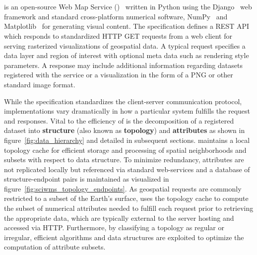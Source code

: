 \section{\sciwms{}}
\label{sec:sciwms}
\Sciwms{} is an open-source Web Map Service (\wms{})~\cite{wms14} written in
Python using the Django~\cite{django} web framework and standard
cross-platform numerical software, NumPy~\cite{numpy11} and
Matplotlib~\cite{hunter07} for generating visual content. The \wms{}
specification defines a REST API~\cite{Fielding02} which responds to
standardized HTTP GET requests from a web client for serving
rasterized visualizations of geospatial data. A typical \wms{} request
specifies a data layer and region of interest with optional meta data
such as rendering style parameters. A \wms{} response may include
additional information regarding datasets registered with
the service or a visualization in the form of a PNG or other standard
image format.

While the \ogc{} \wms{} specification standardizes the client-server
communication protocol, implementations vary dramatically in
how a particular system fulfills the \wms{} request and
responses. Vital to the efficiency of \sciwms{} is the decomposition
of a registered dataset into \textbf{structure} (also known as
\textbf{topology}) and \textbf{attributes} as shown in
figure~\ref{fig:data_hierarchy} and detailed in subsequent
sections. \Sciwms{} maintains a local topology cache for efficient
storage and processing of spatial neighborhoods and subsets with
respect to data structure. To minimize redundancy, attributes are not
replicated locally but referenced via standard web-services and a
database of structure-endpoint pairs is maintained as visualized in
figure~\ref{fig:sciwms_topology_endpoints}. As geospatial \wms{}
requests are commonly restricted to a subset of the Earth's surface,
\sciwms{} uses the topology cache to compute the subset of numerical
attributes needed to fulfill each request prior to retrieving the
appropriate data, which are typically external to the server hosting
\sciwms{} and accessed via HTTP. Furthermore, by classifying a
topology as regular or irregular, efficient algorithms and data
structures are exploited to optimize the computation of attribute
subsets.
